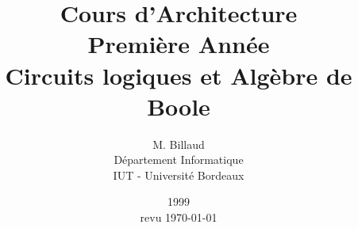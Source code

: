 \documentclass[]{report}
\title{
Cours d'Architecture\\
Première Année \\
{\bf Circuits logiques et Alg\`ebre de Boole} 
}
\author{M. Billaud \\
        Département Informatique \\
        IUT - Université Bordeaux}
\date{1999 \\ revu \today}
\begin{document}
\maketitle

\tableofcontents
\listoffigures

\sloppy

% 



 
 

 
\end{document}
